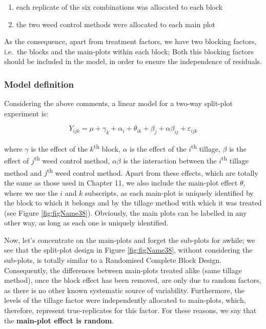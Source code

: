 \documentclass[a4paper,12pt,oneside]{book}
\providecommand{\tightlist}{%
  \setlength{\itemsep}{0pt}\setlength{\parskip}{0pt}}
\begin{document}
\begin{enumerate}
\def\labelenumi{\arabic{enumi}.}
\tightlist
\item
  each replicate of the six combinations was allocated to each block
\item
  the two weed control methods were allocated to each main plot
\end{enumerate}

As the consequence, apart from treatment factors, we have two blocking factors, i.e.~the blocks and the main-plots within each block; Both this blocking factors should be included in the model, in order to ensure the independence of residuals.

\hypertarget{model-definition-4}{%
\subsubsection{Model definition}\label{model-definition-4}}

Considering the above comments, a linear model for a two-way split-plot experiment is:

\[Y_{ijk} = \mu + \gamma_k + \alpha_i + \theta_{ik} + \beta_j + \alpha\beta_{ij} + \varepsilon_{ijk}\]

where \(\gamma\) is the effect of the \(k\)\textsuperscript{th} block, \(\alpha\) is the effect of the \(i\)\textsuperscript{th} tillage, \(\beta\) is the effect of \(j\)\textsuperscript{th} weed control method, \(\alpha\beta\) is the interaction between the \(i\)\textsuperscript{th} tillage method and \(j\)\textsuperscript{th} weed control method. Apart from these effects, which are totally the same as those used in Chapter 11, we also include the main-plot effect \(\theta\), where we use the \(i\) and \(k\) subscripts, as each main-plot is uniquely identified by the block to which it belongs and by the tillage method with which it was treated (see Figure \ref{fig:figName38}). Obviously, the main plots can be labelled in any other way, as long as each one is uniquely identified.

Now, let's concentrate on the main-plots and forget the sub-plots for awhile; we see that the split-plot design in Figure \ref{fig:figName38}, without considering the sub-plots, is totally similar to a Randomised Complete Block Design. Consequently, the differences between main-plots treated alike (same tillage method), once the block effect has been removed, are only due to random factors, as there is no other known systematic source of variability. Furthermore, the levels of the tillage factor were independently allocated to main-plots, which, therefore, represent true-replicates for this factor. For these reasons, we say that the \textbf{main-plot effect is random}.
\end{document}
